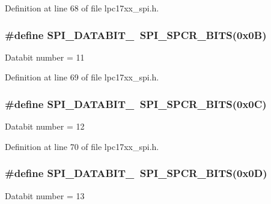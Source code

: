 \-Definition at line 68 of file lpc17xx\-\_\-spi.\-h.

\hypertarget{group___s_p_i___public___macros_gaa0560044d9cafd3409bd9e3e372ba852}{
\subsubsection[{\-S\-P\-I\-\_\-\-D\-A\-T\-A\-B\-I\-T\-\_\-11}]{\setlength{\rightskip}{0pt plus 5cm}\#define {\bf \-S\-P\-I\-\_\-\-D\-A\-T\-A\-B\-I\-T\-\_}~{\bf \-S\-P\-I\-\_\-\-S\-P\-C\-R\-\_\-\-B\-I\-T\-S}(0x0\-B)}}\label{group___s_p_i___public___macros_gaa0560044d9cafd3409bd9e3e372ba852}
\-Databit number = 11 

\-Definition at line 69 of file lpc17xx\-\_\-spi.\-h.

\hypertarget{group___s_p_i___public___macros_ga05009142ffa27219493502e7a08ea496}{
\subsubsection[{\-S\-P\-I\-\_\-\-D\-A\-T\-A\-B\-I\-T\-\_\-12}]{\setlength{\rightskip}{0pt plus 5cm}\#define {\bf \-S\-P\-I\-\_\-\-D\-A\-T\-A\-B\-I\-T\-\_}~{\bf \-S\-P\-I\-\_\-\-S\-P\-C\-R\-\_\-\-B\-I\-T\-S}(0x0\-C)}}\label{group___s_p_i___public___macros_ga05009142ffa27219493502e7a08ea496}
\-Databit number = 12 

\-Definition at line 70 of file lpc17xx\-\_\-spi.\-h.

\hypertarget{group___s_p_i___public___macros_ga57142bbf92868da0e0765f191b106300}{
\subsubsection[{\-S\-P\-I\-\_\-\-D\-A\-T\-A\-B\-I\-T\-\_\-13}]{\setlength{\rightskip}{0pt plus 5cm}\#define {\bf \-S\-P\-I\-\_\-\-D\-A\-T\-A\-B\-I\-T\-\_}~{\bf \-S\-P\-I\-\_\-\-S\-P\-C\-R\-\_\-\-B\-I\-T\-S}(0x0\-D)}}\label{group___s_p_i___public___macros_ga57142bbf92868da0e0765f191b106300}
\-Databit number = 13 

